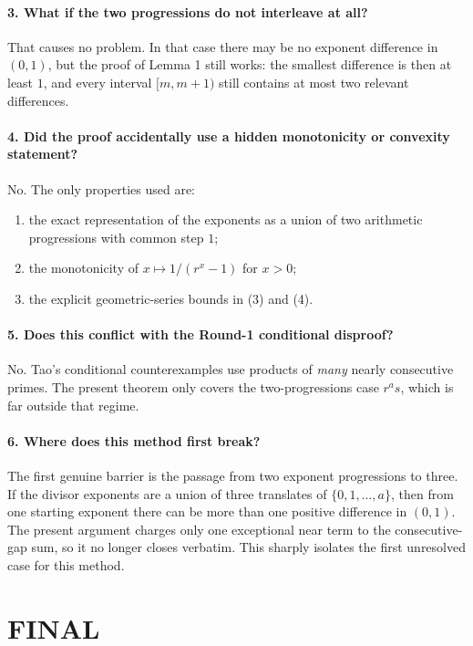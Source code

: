 \paragraph{3. What if the two progressions do not interleave at all?}
That causes no problem. In that case there may be no exponent difference in \((0,1)\), but the proof of Lemma 1 still works: the smallest difference is then at least \(1\), and every interval \([m,m+1)\) still contains at most two relevant differences.

\paragraph{4. Did the proof accidentally use a hidden monotonicity or convexity statement?}
No. The only properties used are:
\begin{enumerate}
\item the exact representation of the exponents as a union of two arithmetic progressions with common step \(1\);
\item the monotonicity of \(x\mapsto 1/(r^x-1)\) for \(x>0\);
\item the explicit geometric-series bounds in (3) and (4).
\end{enumerate}

\paragraph{5. Does this conflict with the Round-1 conditional disproof?}
No. Tao's conditional counterexamples use products of \emph{many} nearly consecutive primes. The present theorem only covers the two-progressions case \(r^a s\), which is far outside that regime.

\paragraph{6. Where does this method first break?}
The first genuine barrier is the passage from two exponent progressions to three. If the divisor exponents are a union of three translates of \(\{0,1,\dots,a\}\), then from one starting exponent there can be more than one positive difference in \((0,1)\). The present argument charges only one exceptional near term to the consecutive-gap sum, so it no longer closes verbatim. This sharply isolates the first unresolved case for this method.

\section{FINAL}

